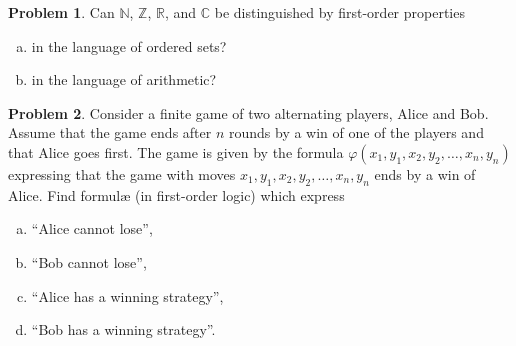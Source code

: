 \documentclass{amsart}
\theoremstyle{definition}
\newtheorem{problem}{Problem}
\begin{document}
\smallskip
\begin{problem}
Can $\mathbb N$, $\mathbb Z$, $\mathbb R$, and $\mathbb C$ be distinguished by first-order properties
\begin{enumerate}[(a)]
\item in the language of ordered sets?
\item in the language of arithmetic?
\end{enumerate}
\end{problem}





\smallskip
\begin{problem}
Consider a finite game of two alternating players, Alice and Bob. Assume that the game ends after $n$ rounds by
a win of one of the players and that Alice goes first. The game is given by the formula
$\varphi(x_1, y_1, x_2, y_2,\dots,x_n, y_n)$ expressing that the game with moves $x_1, y_1, x_2, y_2,\dots,x_n, y_n$ ends
by a win of Alice. Find formul{\ae} (in first-order logic) which express
\begin{enumerate}[(a)]
    \item ``Alice cannot lose'',
    \item ``Bob cannot lose'',
    \item ``Alice has a winning strategy'',
    \item ``Bob has a winning strategy''.
\end{enumerate}
\end{problem}
\end{document}
